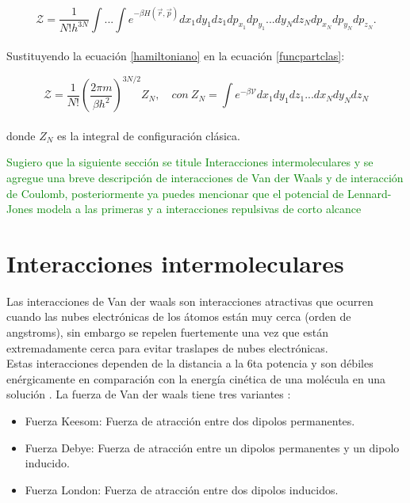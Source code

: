 \begin{equation} \label{funcpartclas}
    \mathcal{Z} = \frac{1}{N!h^{3N}}\int ...\int e^{-\beta H(\vec{r},\vec{p})}dx_1dy_1dz_1dp_{x_1}dp_{y_1}...dy_N dz_Ndp_{x_N}dp_{y_N}dp_{z_N}.
\end{equation}\\

Sustituyendo la ecuación \ref{hamiltoniano} en la ecuación \ref{funcpartclas}\cite{feynman1972statistical}:

\begin{equation} \label{funcpartclasconfig}
    \mathcal{Z} = \frac{1}{N!}\left( \frac{2\pi m}{\beta h^2} \right)^{3N/2}Z_N,\quad con\ Z_N = \int e^{-\beta \mathcal{V}}dx_1dy_1dz_1...dx_N dy_N dz_N
\end{equation}\\

donde $Z_N$ es la integral de configuración clásica.

\textcolor{green}{Sugiero que la siguiente sección se titule 
Interacciones intermoleculares y se agregue una breve descripción de interacciones de Van der Waals y de interacción de Coulomb, posteriormente ya puedes mencionar que el potencial de Lennard-Jones modela a las primeras y a interacciones repulsivas de corto alcance}


\section{Interacciones intermoleculares}

Las interacciones de Van der waals son interacciones atractivas que ocurren cuando las nubes electrónicas de los átomos están muy cerca (orden de angstroms), sin embargo se repelen fuertemente una vez que están extremadamente cerca para evitar traslapes de nubes electrónicas.\\

Estas interacciones dependen de la distancia a la 6ta potencia y son débiles enérgicamente en comparación con la energía cinética de una molécula en una solución \cite{201753}. La fuerza de Van der waals tiene tres variantes \cite{ROY20151}:

\begin{itemize}
    \item Fuerza Keesom: Fuerza de atracción entre dos dipolos permanentes.
    \item Fuerza Debye: Fuerza de atracción entre un dipolos permanentes y un dipolo inducido.
    \item Fuerza London: Fuerza de atracción entre dos dipolos inducidos.
\end{itemize}


